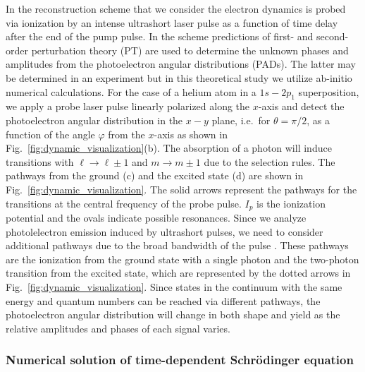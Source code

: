 In the reconstruction scheme that we consider the electron dynamics is probed via ionization by an intense ultrashort laser pulse as a function of time delay  after the end of the pump pulse. In the scheme predictions of first- and second-order perturbation theory (PT) are used to determine the unknown phases and amplitudes from the photoelectron angular distributions (PADs). The latter may be determined in an experiment but in this theoretical study we utilize ab-initio numerical calculations. For the case of a helium atom in a $1s-2p_1$ superposition, we apply a probe laser pulse linearly polarized along the $x$-axis and detect the photoelectron angular distribution in the $x-y$ plane, i.e.\ for $\theta = \pi/2$, as a function of the angle $\varphi$ from the $x$-axis as shown in Fig.~\ref{fig:dynamic_visualization}(b). The absorption of a photon will induce transitions with $\ell \rightarrow \ell \pm 1$ and $m \rightarrow m \pm 1$ due to the selection rules. The pathways from the ground (c) and the excited state (d) are shown in Fig.\ \ref{fig:dynamic_visualization}. The solid arrows represent the pathways for the transitions at the central frequency of the probe pulse. $I_p$ is the ionization potential and the ovals indicate possible resonances. Since we analyze photolelectron emission induced by ultrashort pulses, we need to consider additional pathways due to the broad bandwidth of the pulse \cite{venzke2020_ionization}. These pathways are the ionization from the ground state with a single photon and the two-photon transition from the excited state, which are represented by the dotted arrows in Fig.~\ref{fig:dynamic_visualization}. Since states in the continuum with the same energy and quantum numbers can be reached via different pathways, the photoelectron angular distribution will change in both shape and yield as the relative amplitudes and phases of each signal varies.

\subsubsection{Numerical solution of time-dependent Schr\"odinger equation}

